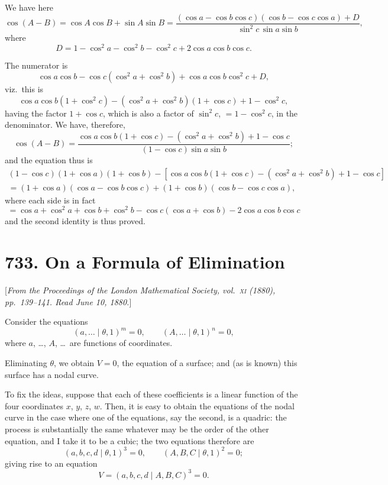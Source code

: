 \documentclass[11pt,a4paper]{book}
\begin{document}
We have here
\[
\cos(A-B) = \cos A\cos B + \sin A\sin B
= \frac{(\cos a - \cos b\cos c)(\cos b - \cos c\cos a) + D}
{\sin^2 c\,\sin a\sin b},
\]
where
\[
D = 1 - \cos^2 a - \cos^2 b - \cos^2 c + 2\cos a\cos b\cos c.
\]

The numerator is
\[
\cos a\cos b - \cos c(\cos^2 a + \cos^2 b) + \cos a\cos b\cos^2 c + D,
\]
viz.~this is
\[
\cos a\cos b(1+\cos^2 c) - (\cos^2 a + \cos^2 b)(1+\cos c) + 1 - \cos^2 c,
\]
having the factor $1+\cos c$, which is also a factor of $\sin^2 c$, $=1-\cos^2 c$,
in the denominator. We have, therefore,
\[
\cos(A-B) = \frac{\cos a\cos b(1+\cos c) - (\cos^2 a + \cos^2 b) + 1 - \cos c}
{(1-\cos c)\sin a\sin b};
\]
and the equation thus is
\begin{multline*}
(1-\cos c)(1+\cos a)(1+\cos b)
- [\cos a\cos b(1+\cos c) - (\cos^2 a + \cos^2 b) + 1 - \cos c]\\
= (1+\cos a)(\cos a - \cos b\cos c) + (1+\cos b)(\cos b - \cos c\cos a),
\end{multline*}
where each side is in fact
\[
= \cos a + \cos^2 a + \cos b + \cos^2 b - \cos c(\cos a + \cos b) - 2\cos a\cos b\cos c
\]
and the second identity is thus proved.

\newpage
\section*{733. On a Formula of Elimination}

[\textit{From the Proceedings of the London Mathematical Society, vol.~\textsc{xi} (1880), pp.~139--141.
Read June 10, 1880.}]

Consider the equations
\[
(a,\ldots\mid\theta,1)^m = 0,\qquad
(A,\ldots\mid\theta,1)^n = 0,
\]
where $a$, \dots, $A$, \dots\ are functions of coordinates.

Eliminating $\theta$, we obtain $V=0$, the equation of a surface; and
(as is known) this surface has a nodal curve.

To fix the ideas, suppose that each of these coefficients is a linear
function of the four coordinates $x$, $y$, $z$, $w$.
Then, it is easy to obtain the equations of the nodal curve in the case
where one of the equations, say the second, is a quadric: the process
is substantially the same whatever may be the order of the other equation,
and I take it to be a cubic; the two equations therefore are
\[
(a,b,c,d\mid\theta,1)^3 = 0,\qquad
(A,B,C\mid\theta,1)^2 = 0;
\]
giving rise to an equation
\[
V = (a,b,c,d\mid A,B,C)^3 = 0.
\]
\end{document}
